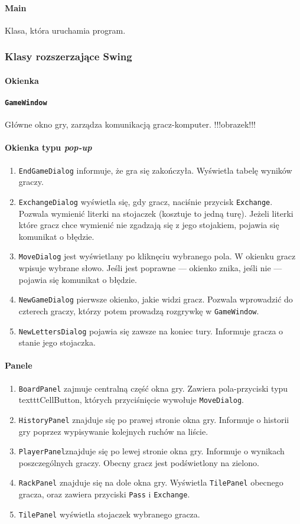\documentclass[a4paper]{article}
\begin{document}
\paragraph{Main}
Klasa, która uruchamia program.
\subsubsection{Klasy rozszerzające Swing}
\paragraph{Okienka}
\paragraph{\texttt{GameWindow}} Główne okno gry, zarządza komunikacją gracz-komputer.
!!!obrazek!!!
\paragraph{Okienka typu \textit{pop-up}}
\begin{enumerate}
\item[] \texttt{EndGameDialog} informuje, że gra się zakończyła. Wyświetla tabelę wyników graczy.
\item[] \texttt{ExchangeDialog} wyświetla się, gdy gracz, naciśnie przycisk \texttt{Exchange}. Pozwala wymienić literki na stojaczek (kosztuje to jedną turę).
Jeżeli literki które gracz chce wymienić nie zgadzają się z jego stojakiem, pojawia się komunikat o błędzie.
\item[] \texttt{MoveDialog} jest wyświetlany po kliknęciu wybranego pola. W okienku gracz wpisuje wybrane słowo.
Jeśli jest poprawne --- okienko znika, jeśli nie --- pojawia się komunikat o błędzie.
\item[] \texttt{NewGameDialog} pierwsze okienko, jakie widzi gracz.
Pozwala wprowadzić do czterech graczy, którzy potem prowadzą rozgrywkę w \texttt{GameWindow}.
\item[] \texttt{NewLettersDialog} pojawia się zawsze na koniec tury. Informuje gracza o stanie jego stojaczka.
\end{enumerate}
\paragraph{Panele}
\begin{enumerate}
\item[] \texttt{BoardPanel} zajmuje centralną część okna gry. Zawiera pola-przyciski typu texttt{CellButton}, których przyciśnięcie wywołuje \texttt{MoveDialog}.
\item[] \texttt{HistoryPanel} znajduje się po prawej stronie okna gry. Informuje o historii gry poprzez wypisywanie kolejnych ruchów na liście.
\item[] \texttt{PlayerPanel}znajduje się po lewej stronie okna gry. Informuje o wynikach poszczególnych graczy. Obecny gracz jest podświetlony na zielono.
\item[] \texttt{RackPanel} znajduje się na dole okna gry. Wyświetla \texttt{TilePanel} obecnego gracza, oraz zawiera przyciski \texttt{Pass} i \texttt{Exchange}.
\item[] \texttt{TilePanel} wyświetla stojaczek wybranego gracza.
\end{enumerate}
\end{document}
